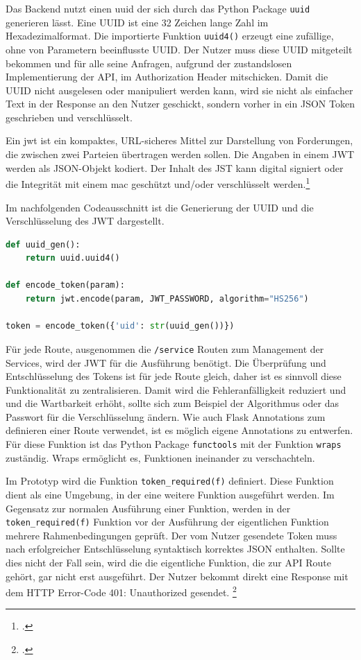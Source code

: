 Das Backend nutzt einen \ac{uuid} der sich durch das Python Package \texttt{uuid} generieren lässt. Eine UUID ist eine 32 Zeichen lange Zahl im Hexadezimalformat. Die importierte Funktion \texttt{uuid4()} erzeugt eine zufällige, ohne von Parametern beeinflusste UUID. Der Nutzer muss diese UUID mitgeteilt bekommen und für alle seine Anfragen, aufgrund der zustandslosen Implementierung der API, im Authorization Header mitschicken. Damit die UUID nicht ausgelesen oder manipuliert werden kann, wird sie nicht als einfacher Text in der Response an den Nutzer geschickt, sondern vorher in ein JSON Token geschrieben und verschlüsselt.

Ein \ac{jwt} ist ein kompaktes, URL-sicheres Mittel zur Darstellung von Forderungen, die zwischen zwei Parteien übertragen werden sollen. Die Angaben in einem JWT werden als JSON-Objekt kodiert. Der Inhalt des JST kann digital signiert oder die Integrität mit einem \ac{mac} geschützt und/oder verschlüsselt werden.\footcite{jones2015json}

Im nachfolgenden Codeausschnitt ist die Generierung der UUID und die Verschlüsselung des JWT dargestellt.
\begin{lstlisting}[language=Python]
def uuid_gen():
    return uuid.uuid4()
    
def encode_token(param):
    return jwt.encode(param, JWT_PASSWORD, algorithm="HS256")

token = encode_token({'uid': str(uuid_gen())})
\end{lstlisting}

Für jede Route, ausgenommen die \texttt{/service} Routen zum Management der Services, wird der JWT für die Ausführung benötigt. Die Überprüfung und Entschlüsselung des Tokens ist für jede Route gleich, daher ist es sinnvoll diese Funktionalität zu zentralisieren. Damit wird die Fehleranfälligkeit reduziert und und die Wartbarkeit erhöht, sollte sich zum Beispiel der Algorithmus oder das Passwort für die Verschlüsselung ändern. Wie auch Flask Annotations zum definieren einer Route verwendet, ist es möglich eigene Annotations zu entwerfen. Für diese Funktion ist das Python Package \texttt{functools} mit der Funktion \texttt{wraps} zuständig. Wraps ermöglicht es, Funktionen ineinander zu verschachteln.

Im Prototyp wird die Funktion \texttt{token\_{}required(f)} definiert. Diese Funktion dient als eine Umgebung, in der eine weitere Funktion ausgeführt werden. Im Gegensatz zur normalen Ausführung einer Funktion, werden in der \texttt{token\_{}required(f)} Funktion vor der Ausführung der eigentlichen Funktion mehrere Rahmenbedingungen geprüft. Der vom Nutzer gesendete Token muss nach erfolgreicher Entschlüsselung syntaktisch korrektes JSON enthalten. Sollte dies nicht der Fall sein, wird die die eigentliche Funktion, die zur API Route gehört, gar nicht erst ausgeführt. Der Nutzer bekommt direkt eine Response mit dem HTTP Error-Code 401: Unauthorized gesendet. \footcite{fielding1999rfc2616}

